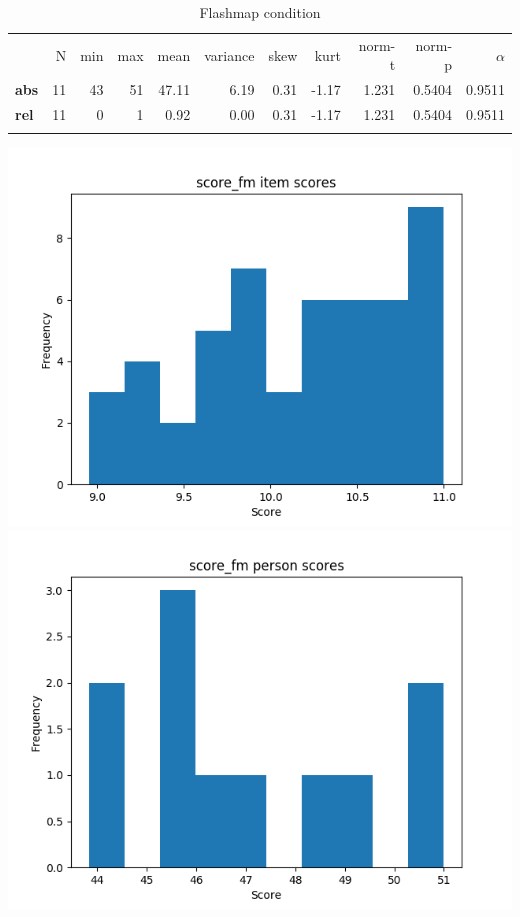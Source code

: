 \begin{longtable}[c]{@{}lrrrrrrrrrr@{}}
\caption{Flashmap condition}
\endfirsthead
\toprule\addlinespace
& N & min & max & mean & variance & skew & kurt & norm-t &
norm-p & $\alpha$
\\\addlinespace
\midrule
\textbf{abs} & 11 & 43 & 51 & 47.11 & 6.19 & 0.31 & -1.17 & 1.231 &
0.5404 & 0.9511
\\\addlinespace
\textbf{rel} & 11 & 0 & 1 & 0.92 & 0.00 & 0.31 & -1.17 & 1.231 & 0.5404
& 0.9511
\\\addlinespace
\bottomrule
\end{longtable}

\includegraphics{img/score_fm_diff.png} \includegraphics{img/score_fm_abil.png}

